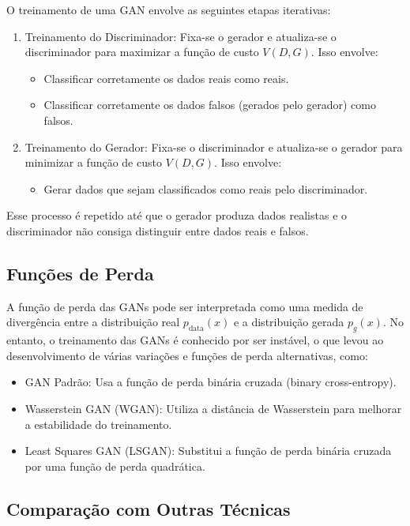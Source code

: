 \documentclass{article}
\begin{document}
O treinamento de uma GAN envolve as seguintes etapas iterativas:
\begin{enumerate}
    \item Treinamento do Discriminador: Fixa-se o gerador e atualiza-se o discriminador para maximizar a função de custo $V(D, G)$. Isso envolve:
    \begin{itemize}
        \item Classificar corretamente os dados reais como reais.
        \item Classificar corretamente os dados falsos (gerados pelo gerador) como falsos.
    \end{itemize}
    \item Treinamento do Gerador: Fixa-se o discriminador e atualiza-se o gerador para minimizar a função de custo $V(D, G)$. Isso envolve:
    \begin{itemize}
        \item Gerar dados que sejam classificados como reais pelo discriminador.

    \end{itemize}
\end{enumerate}
Esse processo é repetido até que o gerador produza dados realistas e o discriminador não consiga distinguir entre dados reais e falsos.

\subsection{Funções de Perda}

A função de perda das GANs pode ser interpretada como uma medida de divergência entre a distribuição real $p_{\text{data}}(x)$ e a distribuição gerada $p_g(x)$. No entanto, o treinamento das GANs é conhecido por ser instável, o que levou ao desenvolvimento de várias variações e funções de perda alternativas, como:
\begin{itemize}
    \item GAN Padrão: Usa a função de perda binária cruzada (binary cross-entropy).
    \item Wasserstein GAN (WGAN): Utiliza a distância de Wasserstein para melhorar a estabilidade do treinamento.
    \item Least Squares GAN (LSGAN): Substitui a função de perda binária cruzada por uma função de perda quadrática.    
\end{itemize}

\subsection{Comparação com Outras Técnicas}
\end{document}
